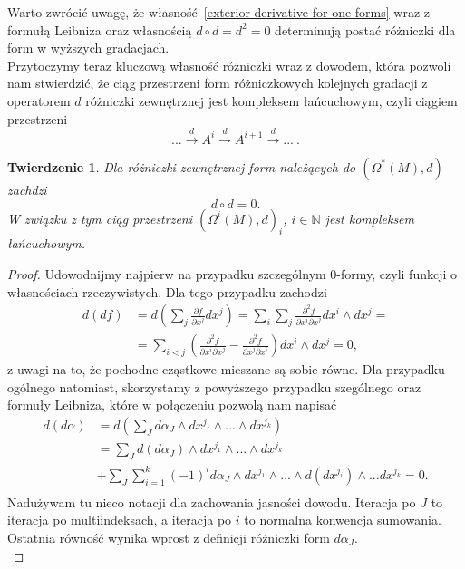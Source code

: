 \documentclass[licencjacka]{pracamgr}
\theoremstyle{definition}
\theoremstyle{definition}
\theoremstyle{plain}
\theoremstyle{plain}
\theoremstyle{plain}
\newtheorem{theorem}{Twierdzenie}[section]
\theoremstyle{plain}
\theoremstyle{plain}
\begin{document}
Warto zwrócić uwagę, że własność~\ref{exterior-derivative-for-one-forms} wraz z
formułą Leibniza oraz własnością $d \circ d = d^2 = 0$ determinują postać
różniczki dla form w wyższych gradacjach. \\

Przytoczymy teraz kluczową własność różniczki wraz z dowodem, która pozwoli nam
stwierdzić, że ciąg przestrzeni form różniczkowych kolejnych gradacji z
operatorem $d$ różniczki zewnętrznej jest kompleksem łańcuchowym, czyli ciągiem
przestrzeni
\[
   ... \xrightarrow{d} 
A^i 
   \xrightarrow{d} 
A^{i+1}
   \xrightarrow{d} 
...~.
\]

\begin{theorem}
Dla różniczki zewnętrznej form należących do $\left(\Omega^\ast (M), d \right)$
zachdzi
\[
d \circ d = 0.
\]
W związku z tym ciąg przestrzeni  $\left(\Omega^i (M), d \right)_i$, $i \in
\mathbb{N}$ jest kompleksem łańcuchowym.
\end{theorem}

\begin{proof}
Udowodnijmy najpierw na przypadku szczególnym 0-formy, czyli funkcji o
własnościach rzeczywistych. Dla tego przypadku zachodzi
\begin{align*}
d(df) & = d \left( \sum_j \frac{\partial f} {\partial x^j} dx^j \right) =
\sum_i \sum_j \frac{\partial^2 f}{\partial x^i \partial x^j } dx^i \wedge dx^j =  \\
& = \sum_{i < j} \left(
\frac{\partial^2 f}{\partial x^i \partial x^j}  -
\frac{\partial^2 f}{\partial x^j \partial x^i} 
 \right) dx^i \wedge dx^j = 0,
\end{align*}
z uwagi na to, że pochodne cząstkowe mieszane są sobie równe. 
Dla przypadku ogólnego natomiast, skorzystamy z powyższego przypadku szególnego
oraz formuły Leibniza, które w połączeniu pozwolą nam napisać
\begin{align*}
d(d \alpha) & = d \left( \sum_J d \alpha_J \wedge dx^{j_1} \wedge ... \wedge dx^{j_k} \right) \\
             & = \sum_J d( d\alpha_J) \wedge dx^{j_1} \wedge ... \wedge dx^{j_k}  \\
& + \sum_J \sum_{i=1}^k (-1)^i d \alpha_J \wedge dx^{j_1} \wedge ... \wedge d(dx^{j_i}) \wedge ... dx^{j_k} = 0.  \\
\end{align*}
Nadużywam tu nieco notacji dla zachowania jasności dowodu. Iteracja po $J$ to iteracja
po multiindeksach, a iteracja po $i$ to normalna konwencja sumowania. Ostatnia
równość wynika wprost z definicji różniczki form $d \alpha_J$. \\

\end{proof}
\end{document}
